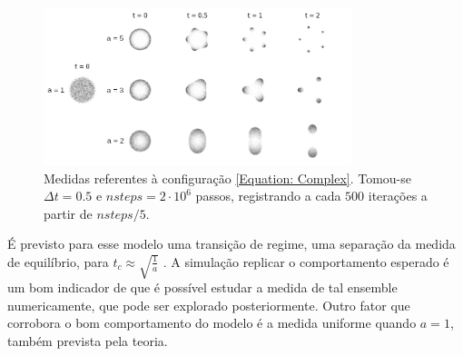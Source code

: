 \documentclass[12pt]{report}
\begin{document}
\begin{figure}[h]
	\centering
	\includegraphics[width=0.8\textwidth]{Assets/complexPotential.png}
	\caption{Medidas referentes à configuração \ref{Equation: Complex}. Tomou-se $\Delta t = 0.5$ e $nsteps = 2\cdot10^6$ passos, registrando a cada $500$ iterações a partir de $nsteps/5$.}
	\label{Figura: Complex}
\end{figure}

É previsto para esse modelo uma transição de regime, uma separação da medida de equilíbrio, para $t_c \approx \sqrt{\frac{1}{a}}$ \cite{balogh2016orthogonal}. A simulação replicar o comportamento esperado é um bom indicador de que é possível estudar a medida de tal ensemble numericamente, que pode ser explorado posteriormente. Outro fator que corrobora o bom comportamento do modelo é a medida uniforme quando $a=1$, também prevista pela teoria. 


\end{document}
